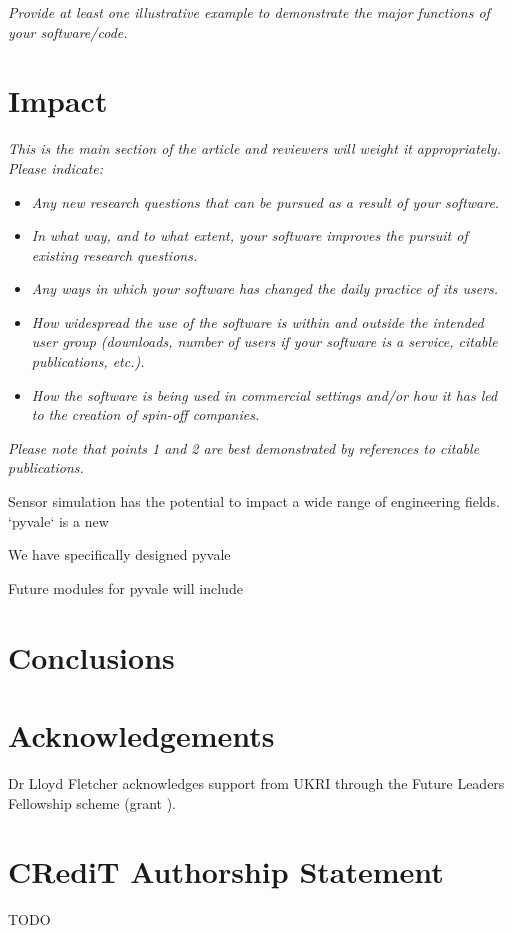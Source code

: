 \documentclass[11pt, a4paper, oneside, onecolumn]{article}
\begin{document}
\textit{Provide at least one illustrative example to demonstrate the major
functions of your software/code.}

\section{Impact}
\textit{This is the main section of the article and reviewers will weight it appropriately.
Please indicate:}
\begin{itemize}
    \item \textit{Any new research questions that can be pursued as a result of your software.}
    \item \textit{In what way, and to what extent, your software improves the pursuit of existing research questions.}
    \item \textit{Any ways in which your software has changed the daily practice of its users.}
    \item \textit{How widespread the use of the software is within and outside the intended user group (downloads, number of users if your software is a service, citable publications, etc.).}
    \item \textit{How the software is being used in commercial settings and/or how it has led to the creation of spin-off companies.}
    \end{itemize}
\textit{Please note that points 1 and 2 are best demonstrated by
  references to citable publications.}
  
Sensor simulation has the potential to impact a wide range of engineering fields. `pyvale` is a new 

We have specifically designed pyvale 

Future modules for pyvale will include 

\section{Conclusions}


\section*{Acknowledgements} \label{sec:acknowledgements}
Dr Lloyd Fletcher acknowledges support from UKRI through the Future Leaders Fellowship scheme (grant ).

\section*{CRediT Authorship Statement}
TODO


 
\end{document}
